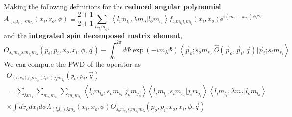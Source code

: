 \documentclass[onecolumn]{revtex4-2}
\begin{document}
Making the following definitions for the \textbf{reduced angular polynomial}
\begin{equation}\label{def:red-ang}
    A_{(l_o l_i)\lambda m_\lambda}(x_i, x_o, \phi)
    \equiv
    \frac{2 +1}{2 + 1}
    \sum_{m_{l_i}m_{l_io}}
    \left\langle
        l_i m_{l_i}, \lambda m_{\lambda} \big\vert l_o m_{l_o}
    \right\rangle
    f_{l_o m_{l_o} l_i m_{l_i}} (x_i, x_o)
    e^{i (m_{l_i} +  m_{l_o}) \phi/2}
\end{equation}
and the \textbf{integrated spin decomposed matrix element},
\begin{equation}
    \label{def:integrated-spin-pwd}
    O_{s_o m_{s_o} s_i m_{s_i} m_\lambda}(p_o, p_i, x_o, x_i, \phi, \vec q)
    \equiv
    \int_{0}^{2\pi} d \Phi \exp\left(-i m_\lambda \Phi\right)
    \left\langle
        \vec p_o; s_o m_{s_o}
        \big\vert
        \hat O(\vec p_o, \vec p_i, \vec q)
        \big\vert
        \vec p_i; s_i m_{s_i}
    \right\rangle
\end{equation}
We can compute the PWD of the operator as
\begin{multline}\label{def:pwd}
    O_{(l_o s_o)j_o m_{j_o} (l_i s_i)j_i m_{j_i}}(p_o, p_i, \vec{q})
    \\ =
    \sum\limits_{\lambda m_\lambda}
    \sum\limits_{m_{s_o} m_{s_i}}
    \sum\limits_{m_{l_o} m_{l_i}}
    \left\langle
        l_o m_{l_o}, s_o m_{s_o} \big\vert j_o m_{j_o}
    \right\rangle
    \left\langle
        l_i m_{l_i}, s_i m_{s_i} \big\vert j_i m_{j_i}
    \right\rangle
    \left\langle
        l_i m_{l_i}, \lambda m_{\lambda} \big\vert l_o m_{l_o}
    \right\rangle
    \\ \times
    \int d x_o d x_i d \phi
    A_{(l_o l_i)\lambda m_\lambda}(x_i, x_o, \phi)
    O_{s_o m_{s_o} s_i m_{s_i} m_\lambda}(p_o, p_i, x_o, x_i, \phi, \vec q)
\end{multline}
\end{document}
